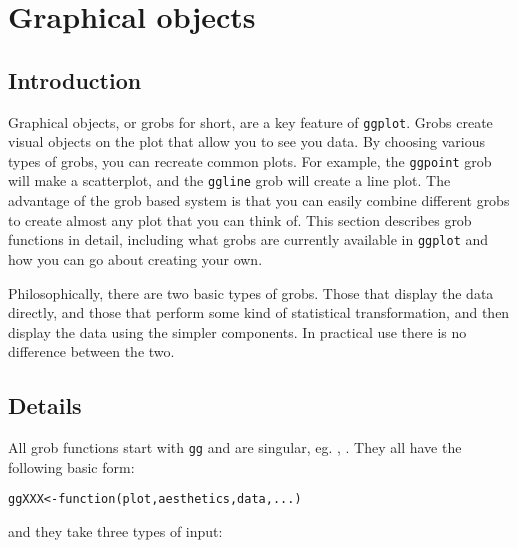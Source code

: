 


\chapter{Graphical objects}

\section{Introduction}\label{sec:introduction}

Graphical objects, or grobs for short, are a key feature of {\tt ggplot}.  Grobs create visual objects on the plot that allow you to see you data.  By choosing various types of grobs, you can recreate common plots.  For example, the {\tt ggpoint} grob will make a scatterplot, and the {\tt ggline} grob will create a line plot.  The advantage of the grob based system is that you can easily combine different grobs to create almost any plot that you can think of.  This section describes grob functions in detail, including what grobs are currently available in {\tt ggplot} and how you can go about creating your own.

Philosophically, there are two basic types of grobs.  Those that display the data directly, and those that perform some kind of statistical transformation, and then display the data using the simpler components.  In practical use there is no difference between the two.
 
\section{Details}\label{sec:details}

All grob functions start with {\tt gg} and are singular, eg. , .  They all have the following basic form:

\begin{alltt}
ggXXX <- function(plot, aesthetics, data, ...) {}
\end{alltt}

\noindent and they take three types of input:

